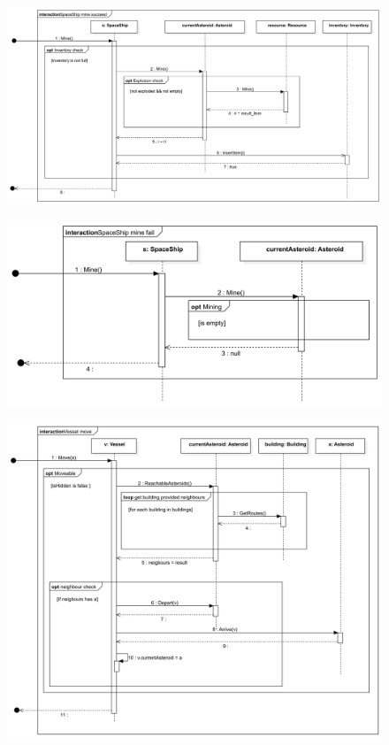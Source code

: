 \begin{figure}[H] 
\centering 
\includegraphics[width=1\textwidth]{docs/3_Project/svg/Design Model!Vessel Actions!SpaceShip mine succeed!SpaceShip mine succeed_15.png} 
\end{figure} 

\begin{figure}[H] 
\centering 
\includegraphics[width=1\textwidth]{docs/3_Project/svg/Design Model!Vessel Actions!SpaceShip mine fail!SpaceShip mine fail_16.png} 
\end{figure} 

\begin{figure}[H] 
\centering 
\includegraphics[width=1\textwidth]{docs/3_Project/svg/Design Model!Vessel Actions!Vessel move!Vessel move_17.png} 
\end{figure} 

